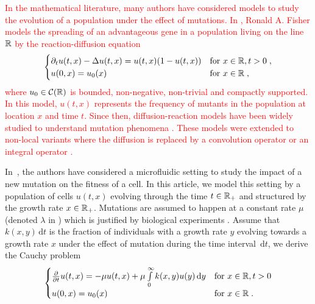 \documentclass[11pt]{amsart}
\newcommand{\f}{\frac}
\newcommand{\diff}{\,\mathrm{d}}
\newcommand{\guim}[1]{\textcolor{red}{#1}}
\begin{document}
\guim{
In the mathematical literature, many authors have considered models to study the evolution of a population under the effect of mutations. In \cite{fisher1937wave}, Ronald A. Fisher models the spreading of an advantageous gene in a population living on the line $\mathbb{R}$ by the reaction-diffusion equation
    \begin{equation*}
        \begin{cases}
            \partial_t u(t,x) - \Delta u(t,x) = u(t,x)(1-u(t,x)) & \text{for } x \in \mathbb{R},  t > 0
            \; ,
            \\
            u(0, x) = u_0(x)     & \text{for } x \in \mathbb{R} \; ,
        \end{cases}
    \end{equation*} 
where $u_0 \in \mathcal{C}(\mathbb{R})$ is bounded, non-negative, non-trivial and compactly supported. 
In this model, $u(t,x)$ represents the frequency of mutants in the population at location $x$ and time $t$.
Since then, diffusion-reaction models have been widely studied to understand mutation phenomena \cite{fife1979mathematical, lam2022introduction}. 
These models were extended to non-local variants where the diffusion is replaced by a convolution operator \cite{coville2007non} or an integral operator \cite{burger1996stationary,bonnefon2017concentration, alfaro2023confining}.}

In~\cite{robert2018mutation}, the authors have considered a microfluidic setting to study the impact of a new mutation on the fitness of a cell. 
In this article, we model this setting by a population of cells $u(t,x)$ evolving through the time $t \in \mathbb{R}_+$ and structured by the growth rate $x \in \mathbb{R}_+$. Mutations are assumed to happen at a constant rate $\mu$ (denoted $\lambda$ in \cite{robert2018mutation}) which is justified by biological experiments \cite{robert2018mutation}.  Assume that $k(x,y)\diff t$ is the fraction of individuals with a growth rate $y$ evolving towards a growth rate $x$ under the effect of mutation during the time interval $\diff t$, we derive the Cauchy problem
    \begin{equation}
    \begin{cases}
    \f{\partial}{\partial t} u(t,x) = - \mu u(t,x) + \mu \int\limits_0^\infty k(x,y) u(y) \diff y 
    & \text{for } x \in \RR,  t > 0
    \\
    u(0,x) = u_0(x)  & \text{for } x \in \RR \eqfinp
    \end{cases}
    \label{eq:lydia}
    \end{equation}
\end{document}
